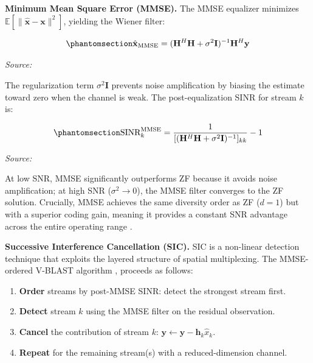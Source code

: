 \textbf{Minimum Mean Square Error (MMSE).} The MMSE equalizer minimizes \(\mathbb{E}[\|\hat{\mathbf{x}} - \mathbf{x}\|^2]\), yielding the Wiener filter:

\begin{equation}\protect\phantomsection\label{eq:mmse-equalizer}{\hat{\mathbf{x}}_{\text{MMSE}} = (\mathbf{H}^H\mathbf{H} + \sigma^2\mathbf{I})^{-1}\mathbf{H}^H\mathbf{y}
}\end{equation} \par{\small\textit{Source: \cite{tse2005fundamentals, tse1999linear}}}

The regularization term \(\sigma^2\mathbf{I}\) prevents noise amplification by biasing the estimate toward zero when the channel is weak. The post-equalization SINR for stream \(k\) is:

\begin{equation}\protect\phantomsection\label{eq:mmse-sinr}{\text{SINR}_k^{\text{MMSE}} = \frac{1}{[(\mathbf{H}^H\mathbf{H} + \sigma^2\mathbf{I})^{-1}]_{kk}} - 1
}\end{equation} \par{\small\textit{Source: \cite{tse2005fundamentals, tse1999linear}}}

At low SNR, MMSE significantly outperforms ZF because it avoids noise amplification; at high SNR (\(\sigma^2 \to 0\)), the MMSE filter converges to the ZF solution. Crucially, MMSE achieves the same diversity order as ZF (\(d = 1\)) but with a superior coding gain, meaning it provides a constant SNR advantage across the entire operating range \cite{tse1999linear}.

\textbf{Successive Interference Cancellation (SIC).} SIC is a non-linear detection technique that exploits the layered structure of spatial multiplexing. The MMSE-ordered V-BLAST algorithm \cite{wolniansky1998vblast}, \cite{foschini1996layered} proceeds as follows:

\begin{enumerate}
\def\labelenumi{\arabic{enumi}.}
\tightlist
\item
  \textbf{Order} streams by post-MMSE SINR: detect the strongest stream first.
\item
  \textbf{Detect} stream \(k\) using the MMSE filter on the residual observation.
\item
  \textbf{Cancel} the contribution of stream \(k\): \(\mathbf{y} \leftarrow \mathbf{y} - \mathbf{h}_k \hat{x}_k\).
\item
  \textbf{Repeat} for the remaining stream(s) with a reduced-dimension channel.
\end{enumerate}

